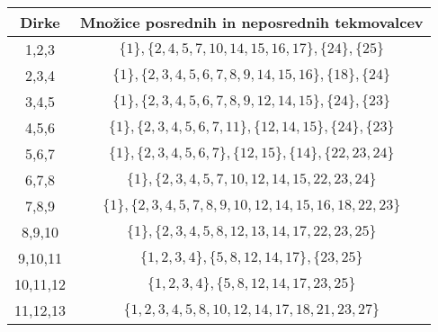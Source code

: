 \documentclass[a4paper, 12pt]{book}
\begin{document}

\begin{table}
\begin{center}
    \begin{tabular}{ |c|c| } 
        \hline
            Dirke & Množice posrednih in neposrednih tekmovalcev \\ 
        \hline
            1,2,3 & $\{1\}, \{2, 4, 5, 7, 10, 14, 15, 16, 17\}, \{24\}, \{25\}$ \\ 
        \hline
            2,3,4 & $\{1\}, \{2, 3, 4, 5, 6, 7, 8, 9, 14, 15, 16\}, \{18\}, \{24\}$ \\ 
        \hline
            3,4,5 & $\{1\}, \{2, 3, 4, 5, 6, 7, 8, 9, 12, 14, 15\}, \{24\}, \{23\}$ \\ 
        \hline
            4,5,6 & $\{1\}, \{2, 3, 4, 5, 6, 7, 11\}, \{12, 14, 15\}, \{24\}, \{23\}$ \\ 
        \hline
            5,6,7 & $\{1\}, \{2, 3, 4, 5, 6, 7\}, \{12, 15\}, \{14\}, \{22, 23, 24\}$ \\ 
        \hline
            6,7,8 & $\{1\}, \{2, 3, 4, 5, 7, 10, 12, 14, 15, 22, 23, 24\}$ \\ 
        \hline
            7,8,9 & $\{1\}, \{2, 3, 4, 5, 7, 8, 9, 10, 12, 14, 15, 16, 18, 22, 23\}$ \\ 
        \hline
            8,9,10 & $\{1\}, \{2, 3, 4, 5, 8, 12, 13, 14, 17, 22, 23, 25\}$ \\ 
        \hline
            9,10,11 & $\{1, 2, 3, 4\}, \{5, 8, 12, 14, 17\}, \{23, 25\}$ \\ 
        \hline
            10,11,12 & $\{1, 2, 3, 4\}, \{5, 8, 12, 14, 17, 23, 25\}$ \\ 
        \hline
            11,12,13 & $\{1, 2, 3, 4, 5, 8, 10, 12, 14, 17, 18, 21, 23, 27\}$ \\ 

\end{tabular}
\end{center}
\end{table}
\end{document}
